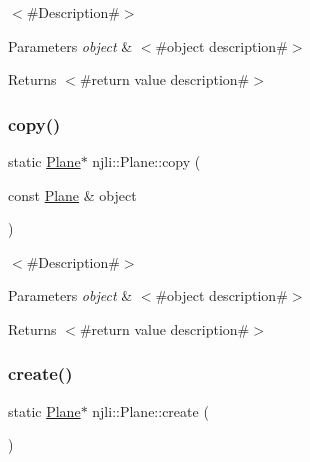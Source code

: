$<$\#\+Description\#$>$


\begin{DoxyParams}{Parameters}
{\em object} & $<$\#object description\#$>$\\
\hline
\end{DoxyParams}
\begin{DoxyReturn}{Returns}
$<$\#return value description\#$>$ 
\end{DoxyReturn}
\mbox{\label{classnjli_1_1_plane_a06750ef9f0dbb17a36e6c202b7be7e96}} 
\subsubsection{\texorpdfstring{copy()}{copy()}}
{\footnotesize\ttfamily static \mbox{\hyperlink{classnjli_1_1_plane}{Plane}}$\ast$ njli\+::\+Plane\+::copy (\begin{DoxyParamCaption}\item[{const \mbox{\hyperlink{classnjli_1_1_plane}{Plane}} \&}]{object }\end{DoxyParamCaption})\hspace{0.3cm}{\ttfamily [static]}}

$<$\#\+Description\#$>$


\begin{DoxyParams}{Parameters}
{\em object} & $<$\#object description\#$>$\\
\hline
\end{DoxyParams}
\begin{DoxyReturn}{Returns}
$<$\#return value description\#$>$ 
\end{DoxyReturn}
\mbox{\label{classnjli_1_1_plane_ac092b738af84c49c487a67a79af4ea9d}} 
\subsubsection{\texorpdfstring{create()}{create()}\hspace{0.1cm}{\footnotesize\ttfamily [1/2]}}
{\footnotesize\ttfamily static \mbox{\hyperlink{classnjli_1_1_plane}{Plane}}$\ast$ njli\+::\+Plane\+::create (\begin{DoxyParamCaption}{ }\end{DoxyParamCaption})\hspace{0.3cm}{\ttfamily [static]}}

